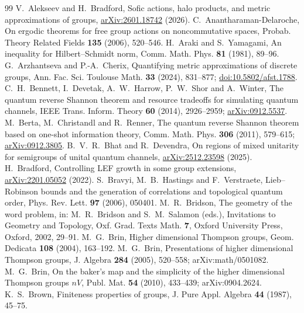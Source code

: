 \begin{thebibliography}{99}
 V.~Alekseev and H.~Bradford, Sofic actions, halo products, and metric approximations of groups, \href{https://arxiv.org/abs/2601.18742}{arXiv:2601.18742} (2026).
 C.~Anantharaman-Delaroche, On ergodic theorems for free group actions on noncommutative spaces, Probab. Theory Related Fields \textbf{135} (2006), 520--546.
 H.~Araki and S.~Yamagami, An inequality for Hilbert--Schmidt norm, Comm. Math. Phys. \textbf{81} (1981), 89--96.
 G.~Arzhantseva and P.-A.~Cherix, Quantifying metric approximations of discrete groups, Ann. Fac. Sci. Toulouse Math. \textbf{33} (2024), 831--877; \href{https://doi.org/10.5802/afst.1788}{doi:10.5802/afst.1788}.
 C.~H.~Bennett, I.~Devetak, A.~W.~Harrow, P.~W.~Shor and A.~Winter, The quantum reverse Shannon theorem and resource tradeoffs for simulating quantum channels, IEEE Trans. Inform. Theory \textbf{60} (2014), 2926--2959; \href{https://arxiv.org/abs/0912.5537}{arXiv:0912.5537}.
 M.~Berta, M.~Christandl and R.~Renner, The quantum reverse Shannon theorem based on one-shot information theory, Comm. Math. Phys. \textbf{306} (2011), 579--615; \href{https://arxiv.org/abs/0912.3805}{arXiv:0912.3805}.
 B.~V.~R.~Bhat and R.~Devendra, On regions of mixed unitarity for semigroups of unital quantum channels, \href{https://arxiv.org/abs/2512.23598}{arXiv:2512.23598} (2025).
 H.~Bradford, Controlling LEF growth in some group extensions, \href{https://arxiv.org/abs/2201.05052}{arXiv:2201.05052} (2022).
 S.~Bravyi, M.~B.~Hastings and F.~Verstraete, Lieb--Robinson bounds and the generation of correlations and topological quantum order, Phys. Rev. Lett. \textbf{97} (2006), 050401.
 M.~R.~Bridson, The geometry of the word problem, in: M.~R.~Bridson and S.~M.~Salamon (eds.), Invitations to Geometry and Topology, Oxf. Grad. Texts Math. \textbf{7}, Oxford University Press, Oxford, 2002, 29--91.
 M.~G.~Brin, Higher dimensional Thompson groups, Geom. Dedicata \textbf{108} (2004), 163--192.
 M.~G.~Brin, Presentations of higher dimensional Thompson groups, J. Algebra \textbf{284} (2005), 520--558; arXiv:math/0501082.
 M.~G.~Brin, On the baker's map and the simplicity of the higher dimensional Thompson groups $nV$, Publ. Mat. \textbf{54} (2010), 433--439; arXiv:0904.2624.
 K.~S.~Brown, Finiteness properties of groups, J. Pure Appl. Algebra \textbf{44} (1987), 45--75.

\end{thebibliography}
